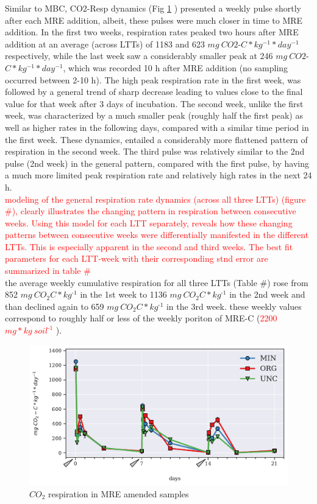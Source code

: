 \documentclass[12pt]{report}
\newcommand{\myRed}[1]{\textcolor{red}{#1}} %
\newlength{\SpaceAfterUnit}
\newcommand{\cumrespunit}{$ mg\ CO_2$\text{-}$C * kg^{\text{-}1}$ \hspace*{\SpaceAfterUnit}}
\newcommand{\genericunit}{$ mg * kg\ soil^{\text{-}1}$ \hspace*{\SpaceAfterUnit}}
\begin{document}
		Similar to MBC, CO2-Resp dynamics (Fig \ref{fig:resp_treated_main} ) presented a weekly pulse shortly after each MRE addition, albeit, these pulses were much closer in time to MRE addition. In the first two weeks, respiration rates peaked two hours after MRE addition at an average (across LTTs) of 1183 and 623 $mg\ CO2$-$C*kg^{-1}*day^{-1}$ respectively, while the last week saw a considerably smaller peak at 246 $mg\ CO2$-$C*kg^{-1}*day^{-1}$, which was recorded 10 h after MRE addition (no sampling occurred between 2-10 h). 
		The high peak respiration rate in the first week, was followed by a general trend of sharp decrease leading to values close to the final value for that week after 3 days of incubation. The second week, unlike the first week, was characterized by a much smaller peak (roughly half the first peak) as well as higher rates in the following days, compared with a similar time period in the first week. These dynamics, entailed a considerably more flattened pattern of respiration in the second week. The third pulse was relatively similar to the 2nd pulse (2nd week) in the general pattern, compared with the first pulse, by having a much more limited peak respiration rate and relatively high rates in the next 24 h.\\
		\myRed{modeling of the general respiration rate dynamics (across all three LTTs) (figure \#), clearly illustrates the changing pattern in respiration between consecutive weeks. 
		Using this model for each LTT separately, reveals how these changing patterns between consecutive weeks were differentially  manifested in the different LTTs. This is especially apparent in the second and third weeks. The best fit parameters for each LTT-week with their corresponding stnd error are summarized in table \#}\\
		the average weekly cumulative respiration for all three LTTs (Table \#) rose from 852 \cumrespunit in the 1st week to 1136 \cumrespunit in the 2nd week and than declined again to 659 \cumrespunit in the 3rd week. these weekly values correspond to roughly half or less of the weekly poriton of MRE-C (\myRed{2200 \genericunit}).
		
		
		\begin{figure}[H]
			\centering
			\includegraphics[scale=0.8]{thesis_figures/main_incubation/MRE_treated/Resp.pdf}
			\caption{$CO_2$ respiration in MRE amended samples}
			\label{fig:resp_treated_main}
		\end{figure}
	
\end{document}
